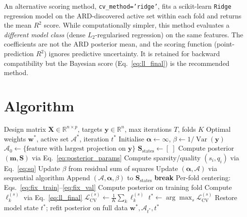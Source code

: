 \documentclass[11pt,a4paper]{article}
\begin{document}
An alternative scoring method, \texttt{cv\_method='ridge'}, fits a scikit-learn \texttt{Ridge} regression model on the ARD-discovered active set within each fold and returns the mean $R^2$ score. While computationally simpler, this method evaluates a \emph{different model class} (dense $L_2$-regularised regression) on the same features. The coefficients are not the ARD posterior mean, and the scoring function (point-prediction $R^2$) ignores predictive uncertainty. It is retained for backward compatibility but the Bayesian score (Eq.~\ref{eq:ll_final}) is the recommended method.

\section{Algorithm}

\begin{algorithm}[H]
\caption{ARD with Retrospective Bayesian CV}
\label{alg:ard_cv}
\begin{algorithmic}[1]
\REQUIRE Design matrix $\mathbf{X} \in \mathbb{R}^{n \times p}$, targets $\mathbf{y} \in \mathbb{R}^n$, 
 max iterations $T$, folds $K$
\ENSURE Optimal weights $\mathbf{w}^*$, active set $\mathcal{A}^*$, iteration $t^*$
\STATE Initialise $\boldsymbol{\alpha} \leftarrow \infty$, $\beta \leftarrow 1/\operatorname{Var}(\mathbf{y})$
\STATE $\mathcal{A}_0 \leftarrow \{\text{feature with largest projection on } \mathbf{y}\}$
\STATE $\mathbf{S}_{\text{states}} \leftarrow [\;]$ 
    \STATE Compute posterior $(\mathbf{m}, \mathbf{S})$ via Eq.~\ref{eq:posterior_params}
    \STATE Compute sparsity/quality $(s_i, q_i)$ via Eq.~\ref{eq:sq}
    \STATE Update $\beta$ from residual sum of squares
    \STATE Update $(\boldsymbol{\alpha}, \mathcal{A})$ via sequential algorithm \citep{tipping2003}
    \STATE Append $(\mathcal{A}, \boldsymbol{\alpha}, \beta)$ to $\mathbf{S}_{\text{states}}$
     \STATE \textbf{break} \ENDIF
\ENDFOR
{}
        \STATE Per-fold centering: Eqs.~\ref{eq:fix_train}--\ref{eq:fix_val}
        \STATE Compute posterior on training fold
        \STATE Compute $\ell_k^{(s)}$ via Eq.~\ref{eq:ll_final}
    \ENDFOR
    \STATE $\mathcal{L}_{\text{CV}}^{(s)} \leftarrow \frac{1}{K}\sum_k \ell_k^{(s)}$
\ENDFOR
\STATE $t^* \leftarrow \arg\max_s \mathcal{L}_{\text{CV}}^{(s)}$
\STATE Restore model state $t^*$; refit posterior on full data
\RETURN $\mathbf{w}^*, \mathcal{A}_{t^*}, t^*$
\end{algorithmic}
\end{algorithm}
\end{document}

